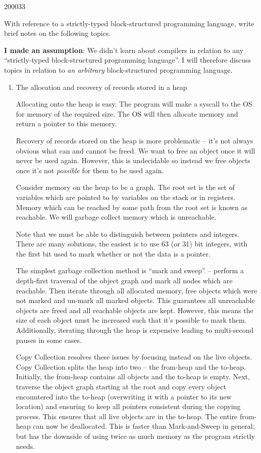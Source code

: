 \documentclass[10pt,\jkfside,a4paper]{article}
\begin{document}
\begin{examquestion}{2000}{3}{3}

With reference to a strictly-typed block-structured programming language,
write brief notes on the following topics.

\textbf{I made an assumption}: We didn't learn about compilers in relation
to any ``strictly-typed block-structured programming language''. I will
therefore discuss topics in relation to \textit{an arbitrary}
block-structured programming language.

\begin{enumerate}

\item The allocation and recovery of records stored in a heap

Allocating onto the heap is easy. The program will make a syscall to the
OS for memory of the required size. The OS will then allocate memory and
return a pointer to this memory.

Recovery of records stored on the heap is more problematic -- it's not
always obvious what can and cannot be freed. We want to free an object once
it will never be used again. However, this is undecidable so instead we free
objects once it's not \textit{possible} for them to be used again.

Consider memory on the heap to be a graph. The root set is the set of
variables which are pointed to by variables on the stack or in registers.
Memory which can be reached by some path from the root set is known as
reachable. We will garbage collect memory which is unreachable.

Note that we must be able to distinguish between pointers and integers.
There are many solutions, the easiest is to use 63 (or 31) bit integers,
with the first bit used to mark whether or not the data is a pointer.

The simplest garbage collection method is ``mark and sweep'' -- perform a
depth-first traversal of the object graph and mark all nodes which are
reachable. Then iterate through all allocated memory, free objects which
were not marked and un-mark all marked objects. This guarantees all unreachable
objects are freed and all reachable objects are kept. However, this means
the size of each object must be increased such that it's possible to mark them.
Additionally, iterating through the heap is expensive leading to
multi-second pauses in some cases.

Copy Collection resolves these issues by focusing instead on the live
objects. Copy Collection splits the heap into two -- the from-heap and the
to-heap. Initially, the from-heap contains all objects and the to-heap is
empty. Next, traverse the object graph starting at the root and copy every
object encountered into the to-heap (overwriting it with a pointer to its new
location) and ensuring to keep all pointers consistent during the copying
process. This ensures that all live objects are in the to-heap. The entire
from-heap can now be deallocated. This is faster than Mark-and-Sweep in
general; but has the downside of using twice as much memory as the
program strictly needs.


\end{enumerate}
\end{examquestion}
\end{document}
